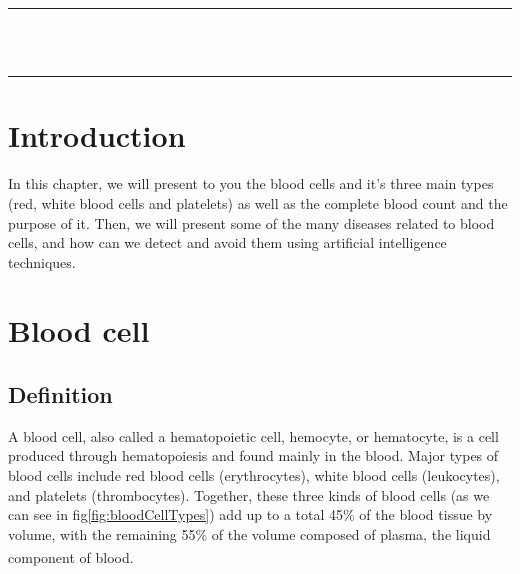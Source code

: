 \vspace*{\fill}
\begin{center}
    {\color{Black} \rule{\linewidth}{1.2mm} }\\
\vspace{0.25in}
{\centering{}}
\vspace{0.35in}\\
    {\color{Black} \rule{\linewidth}{1.2mm} }
\end{center}
\vspace*{\fill}
\setcounter{section}{0}

\newpage

\section{Introduction}
\vspace{0.2in}
\hspace{\parindent}
In this chapter, we will present to you the blood cells and it's three main types (red, white blood cells and platelets) as well as the complete blood count and the purpose of it. Then, we will present some of the many diseases related to blood cells, and how can we detect and avoid them using artificial intelligence techniques.

\section{Blood cell}
\subsection{Definition}
\hspace{\parindent}
A blood cell, also called a hematopoietic cell, hemocyte, or hematocyte, is a cell produced through hematopoiesis and found mainly in the blood. Major types of blood cells include red blood cells (erythrocytes), white blood cells (leukocytes), and platelets (thrombocytes). Together, these three kinds of blood cells (as we can see in fig\ref{fig:bloodCellTypes}) add up to a total 45\% of the blood tissue by volume, with the remaining 55\% of the volume composed of plasma, the liquid component of blood. \textsuperscript{\cite{hopkins1993human}}\\

